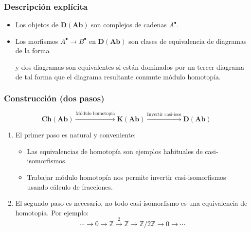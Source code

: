 \documentclass[12pt]{beamer}
\begin{document}
\begin{frame}
  \frametitle{Descripción explícita}
  \begin{itemize}
    \item Los objetos de $\mathbf{D}(\mathbf{Ab})$ son complejos de cadenas $A^{\bullet}$.
      \pause
    \item Los morfismos $A^{\bullet} \to B^{\bullet}$ en $\mathbf{D}(\mathbf{Ab})$ son clases de equivalencia de diagramas de la forma
      \begin{center}
      \end{center}
      \pause
      y dos diagramas son equivalentes si están dominados por un tercer diagrama de tal forma que el diagrama resultante conmute módulo homotopía.
  \end{itemize}
\end{frame}

\begin{frame}
  \frametitle{Construcción (dos pasos)}
  \[ \mathbf{Ch}(\mathbf{Ab}) \xrightarrow{\text{Módulo homotopía}} \mathbf{K}(\mathbf{Ab}) \xrightarrow{\text{Invertir casi-isos}} \mathbf{D}(\mathbf{Ab}) \]
  \pause
  \begin{enumerate}
    \item El primer paso es natural y conveniente:
      \begin{itemize}
        \item Las equivalencias de homotopía son ejemplos habituales de casi-isomorfismos.
        \item Trabajar módulo homotopía nos permite invertir casi-isomorfismos usando cálculo de fracciones.
      \end{itemize}
      \pause
    \item El segundo paso es necesario, no todo casi-isomorfismo es una equivalencia de homotopía.
      Por ejemplo:
      \[ \cdots \to 0 \to \mathbb{Z} \xrightarrow{2} \mathbb{Z} \to \mathbb{Z}/2\mathbb{Z} \to 0 \to \cdots \]
  \end{enumerate}
\end{frame}
\end{document}
